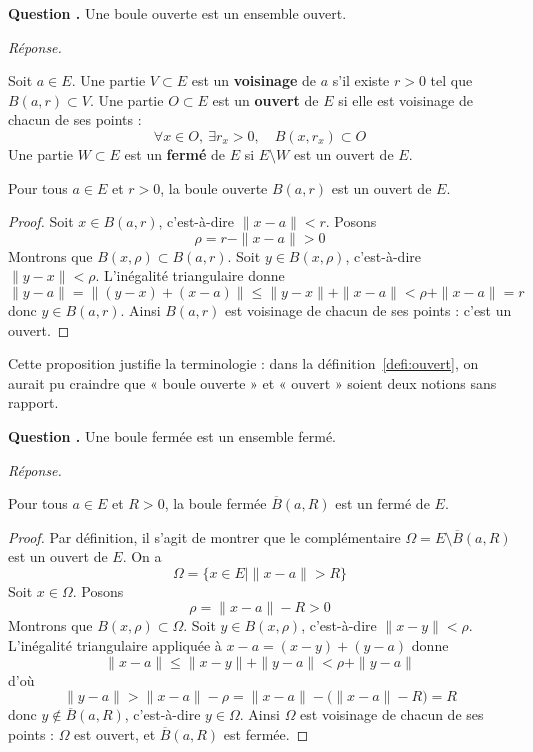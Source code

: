 \documentclass[11pt]{article}
\newcounter{qnum}
\newcommand{\question}[1]{%
\stepcounter{qnum}%
\bigskip
\noindent\textbf{Question \theqnum.} #1\par}
\newcommand{\reponse}{\noindent\textit{Réponse.}\ }
\begin{document}
\question{Une boule ouverte est un ensemble ouvert.}
\reponse

\begin{defi}
\label{defi:ouvert}
Soit $a\in E$. Une partie $V\subset E$ est un \textbf{voisinage} de $a$ s'il existe $r>0$ tel que $B(a,r)\subset V$. Une partie $O\subset E$ est un \textbf{ouvert} de $E$ si elle est voisinage de chacun de ses points :
\[\forall x\in O,\ \exists r_x>0,\quad B(x,r_x)\subset O\]
Une partie $W\subset E$ est un \textbf{fermé} de $E$ si $E\setminus W$ est un ouvert de $E$.
\end{defi}

\begin{prop}
\label{prop:boule-ouverte-ouvert}
Pour tous $a\in E$ et $r>0$, la boule ouverte $B(a,r)$ est un ouvert de $E$.
\end{prop}

\begin{proof}
Soit $x\in B(a,r)$, c'est-à-dire $\|x-a\|<r$. Posons
\[\rho = r-\|x-a\| > 0\]
Montrons que $B(x,\rho)\subset B(a,r)$. Soit $y\in B(x,\rho)$, c'est-à-dire $\|y-x\|<\rho$. L'inégalité triangulaire donne
\[\|y-a\| = \|(y-x)+(x-a)\| \leq \|y-x\|+\|x-a\| < \rho+\|x-a\| = r\]
donc $y\in B(a,r)$. Ainsi $B(a,r)$ est voisinage de chacun de ses points : c'est un ouvert.
\end{proof}

\begin{remarque}
Cette proposition justifie la terminologie : dans la définition~\ref{defi:ouvert}, on aurait pu craindre que « boule ouverte » et « ouvert » soient deux notions sans rapport.
\end{remarque}

\question{Une boule fermée est un ensemble fermé.}
\reponse

\begin{prop}
\label{prop:boule-fermee-fermee}
Pour tous $a\in E$ et $R>0$, la boule fermée $\overline{B}(a,R)$ est un fermé de $E$.
\end{prop}

\begin{proof}
Par définition, il s'agit de montrer que le complémentaire $\Omega=E\setminus\overline{B}(a,R)$ est un ouvert de $E$. On a
\[\Omega = \{x\in E \mid \|x-a\|>R\}\]
Soit $x\in\Omega$. Posons
\[\rho = \|x-a\|-R > 0\]
Montrons que $B(x,\rho)\subset\Omega$. Soit $y\in B(x,\rho)$, c'est-à-dire $\|x-y\|<\rho$. L'inégalité triangulaire appliquée à $x-a=(x-y)+(y-a)$ donne
\[\|x-a\| \leq \|x-y\|+\|y-a\| < \rho+\|y-a\|\]
d'où
\[\|y-a\| > \|x-a\|-\rho = \|x-a\|-\big(\|x-a\|-R\big) = R\]
donc $y\notin\overline{B}(a,R)$, c'est-à-dire $y\in\Omega$. Ainsi $\Omega$ est voisinage de chacun de ses points : $\Omega$ est ouvert, et $\overline{B}(a,R)$ est fermée.
\end{proof}
\end{document}
